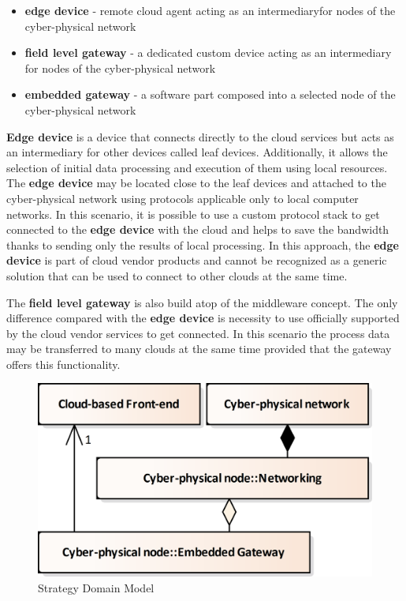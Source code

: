 \documentclass{jacsart}
\begin{document}
\begin{itemize}
  \item \textbf{edge device} - remote cloud agent acting as an intermediaryfor nodes of the cyber-physical network
  \item \textbf{field level gateway} - a dedicated custom device acting as an intermediary for nodes of the cyber-physical network
  \item \textbf{embedded gateway} - a software part composed into a selected node of the cyber-physical network
\end{itemize}

\textbf{Edge device} is a device that connects directly to the cloud
services but acts as an intermediary for other devices called leaf
devices. Additionally, it allows the selection of initial data
processing and execution of them using local resources. The \textbf{edge
  device} may be located close to the leaf devices and attached to the
cyber-physical network using protocols applicable only to local computer
networks. In this scenario, it is possible to use a custom protocol
stack to get connected to the \textbf{edge device} with the cloud and
helps to save the bandwidth thanks to sending only the results of local
processing. In this approach, the \textbf{edge device} is part of cloud
vendor products and cannot be recognized as a generic solution that can
be used to connect to other clouds at the same time.

The \textbf{field level gateway} is also build atop of the middleware
concept. The only difference compared with the \textbf{edge device} is
necessity to use officially supported by the cloud vendor services to
get connected. In this scenario the process data may be transferred to
many clouds at the same time provided that the gateway offers this
functionality.

\begin{figure}
  \centering
  \includegraphics{../.Media/StrategyDomainModel.png}
  \caption{Strategy Domain Model}\label{StrategyDomainModel}
\end{figure}
\end{document}
